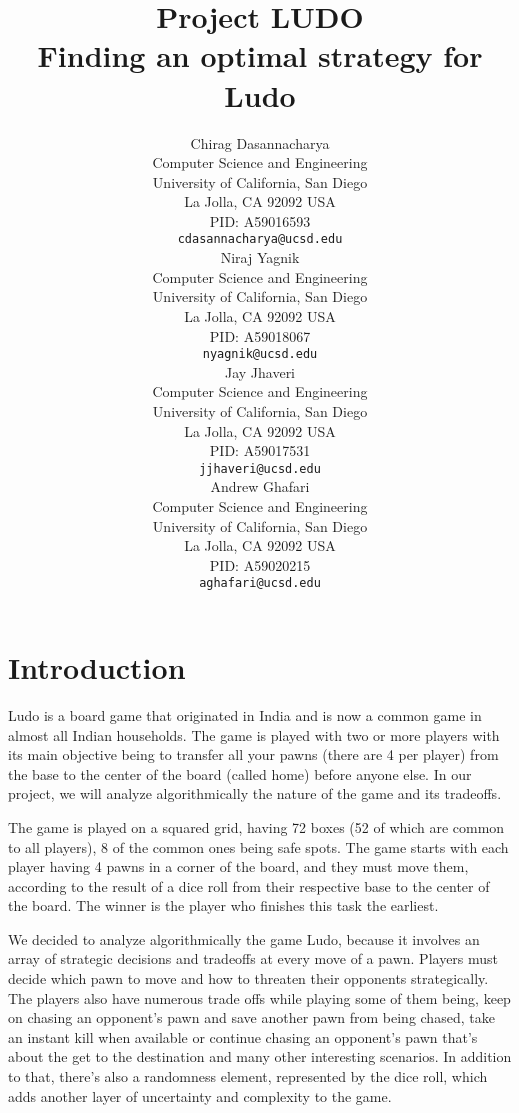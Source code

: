 \documentclass{article} %
\title{Project LUDO\\Finding an optimal strategy for Ludo}%
\author{
Chirag Dasannacharya\\
Computer Science and Engineering\\
University of California, San Diego\\
La Jolla, CA 92092 USA \\
PID: A59016593\\
\texttt{cdasannacharya@ucsd.edu} \\
\And
Niraj Yagnik\\
Computer Science and Engineering\\
University of California, San Diego\\
La Jolla, CA 92092 USA \\
PID: A59018067\\
\texttt{nyagnik@ucsd.edu} \\
\And
Jay Jhaveri\\
Computer Science and Engineering\\
University of California, San Diego\\
La Jolla, CA 92092 USA \\
PID: A59017531\\
\texttt{jjhaveri@ucsd.edu} \\
\And
Andrew Ghafari\\
Computer Science and Engineering\\
University of California, San Diego\\
La Jolla, CA 92092 USA \\
PID: A59020215\\
\texttt{aghafari@ucsd.edu} \\
}
\begin{document}
\maketitle









\section{Introduction}
Ludo is a board game that originated in India and is now a common game in almost all Indian households. The game is played with two or more players with its main objective being to transfer all your pawns (there are 4 per player) from the base to the center of the board (called home) before anyone else. In our project, we will analyze algorithmically the nature of the game and its tradeoffs. 

The game is played on a squared grid, having 72 boxes (52 of which are common to all players), 8 of the common ones being safe spots. The game starts with each player having 4 pawns in a corner of the board, and they must move them, according to the result of a dice roll from their respective base to the center of the board. The winner is the player who finishes this task the earliest.

We decided to analyze algorithmically the game Ludo, because it involves an array of strategic decisions and tradeoffs at every move of a pawn. Players must decide which pawn to move and how to threaten their opponents strategically. The players also have numerous trade offs while playing some of them being, keep on chasing an opponent’s pawn and save another pawn from being chased, take an instant kill when available or continue chasing an opponent’s pawn that’s about the get to the destination and many other interesting scenarios. In addition to that, there’s also a randomness element, represented by the dice roll, which adds another layer of uncertainty and complexity to the game.
\end{document}
